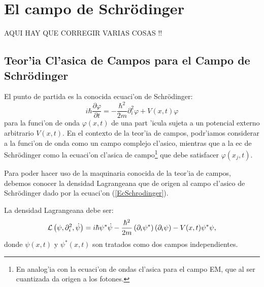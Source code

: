 \chapter{El campo de Schr\"{o}dinger}



AQUI HAY QUE CORREGIR VARIAS COSAS !!

\section{Teor'ia Cl'asica de Campos para el Campo de Schr\"{o}dinger}

El punto de partida es la conocida ecuaci'on de Schr\"{o}dinger:%
\begin{equation}
i\hbar \frac{\partial \varphi }{\partial t}=-\frac{\hbar ^{2}}{2m}\partial
_{i}^{2}\varphi +V(x,t)\varphi \label{EcSchrodinger}
\end{equation}%
para la funci'on de onda $\varphi (x,t)$ de una part%
'icula sujeta a un potencial externo arbitrario $V(x,t).
$ En el contexto de la teor'ia de campos, podr'iamos considerar a la
funci'on de onda como un campo complejo cl'asico, mientras que a la ec
de Schr\"{o}dinger como la ecuaci'on cl'asica de campo\footnote{%
En analog'ia con la ecuaci'on de ondas cl'asica para el campo EM, que al
ser cuantizada da origen a los fotones.} que debe satisfacer $\varphi \left(
x_{j},t\right) .$

Para poder hacer uso de la maquinaria conocida de la teor'ia de campos,
debemos conocer la densidad Lagrangeana que de origen al campo cl'asico
de Schr\"{o}dinger dado por la ecuaci'on (\ref{EcSchrodinger}).

La densidad Lagrangeana debe ser:%
\begin{equation}
{\cal L}\left( \psi ,\partial _{i}^{2},\dot{\psi}\right) =i\hbar \psi ^{\ast
}\dot{\psi}-\frac{\hbar ^{2}}{2m}\left( \partial _{i}\psi ^{\ast }\right)
\left( \partial _{i}\psi \right) -V(x,t)\psi ^{\ast }\psi ,
\label{DensidadLagrangeanadeSchrodinger}
\end{equation}%
donde $\psi (x,t)$ y $\psi ^{\ast }(x,t)$
son tratados como dos campos independientes.

